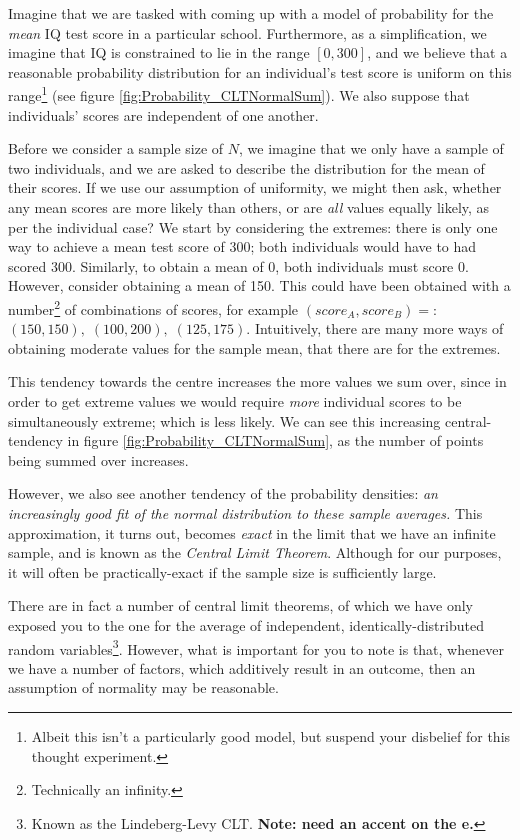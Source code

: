 \documentclass[11pt,fullpage]{book}
\begin{document}
Imagine that we are tasked with coming up with a model of probability for the \textit{mean} IQ test score in a particular school. Furthermore, as a simplification, we imagine that IQ is constrained to lie in the range $\left[0,300\right]$, and we believe that a reasonable probability distribution for an individual's test score is uniform on this range\footnote{Albeit this isn't a particularly good model, but suspend your disbelief for this thought experiment.} (see figure \ref{fig:Probability_CLTNormalSum}). We also suppose that individuals' scores are independent of one another.

Before we consider a sample size of $N$, we imagine that we only have a sample of two individuals, and we are asked to describe the distribution for the mean of their scores. If we use our assumption of uniformity, we might then ask, whether any mean scores are more likely than others, or are \textit{all} values equally likely, as per the individual case? We start by considering the extremes: there is only one way to achieve a mean test score of 300; both individuals would have to had scored 300. Similarly, to obtain a mean of 0, both individuals must score 0. However, consider obtaining a mean of 150. This could have been obtained with a number\footnote{Technically an infinity.} of combinations of scores, for example $\left(score_A,score_B\right)=$: $\left(150,150\right),\;\left(100,200\right),\;\left(125,175\right)$. Intuitively, there are many more ways of obtaining moderate values for the sample mean, that there are for the extremes. 

This tendency towards the centre increases the more values we sum over, since in order to get extreme values we would require \textit{more} individual scores to be simultaneously extreme; which is less likely. We can see this increasing central-tendency in figure \ref{fig:Probability_CLTNormalSum}, as the number of points being summed over increases.

However, we also see another tendency of the probability densities: \textit{an increasingly good fit of the normal distribution to these sample averages.} This approximation, it turns out, becomes \textit{exact} in the limit that we have an infinite sample, and is known as the \textit{Central Limit Theorem}. Although for our purposes, it will often be practically-exact if the sample size is sufficiently large. 

There are in fact a number of central limit theorems, of which we have only exposed you to the one for the average of independent, identically-distributed random variables\footnote{Known as the Lindeberg-Levy CLT. \textbf{Note: need an accent on the e.}}. However, what is important for you to note is that, whenever we have a number of factors, which additively result in an outcome, then an assumption of normality may be reasonable.
\end{document}
